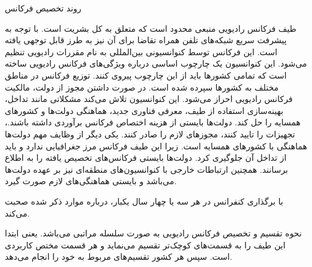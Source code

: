 \Problem
{روند تخصیص فرکانس}
{
طیف فرکانس رادیویی منبعی محدود است که متعلق به کل بشریت است. با توجه به پیشرفت سریع شبکه‌های تلفن همراه تقاضا برای آن نیز به طرز قابل توجهی یافته است.
این فرکانس توسط کنوانسیونی بین‌المللی به نام مقررات رادیویی تنظیم می‌شود. این کنوانسیون یک چارچوب اساسی درباره ویژگی‌های فرکانس رادیویی ساخته است که تمامی کشورها باید از این چارچوب پیروی کنند. توزیع فرکانس در مناطق مختلف به کشورها سپرده شده است. در صورت داشتن مجوز از دولت، مالکیت فرکانس رادیویی احراز می‌شود.
این کنوانسیون تلاش می‌کند مشکلاتی مانند تداخل، بهینه‌سازی استفاده از طیف، معرفی فناوری جدید، هماهنگی دولت‌ها و کشورهای همسایه را حل کند.
دولت‌ها بایستی از هزینه اختصاص فرکانس برآوردی داشته باشند.، تجهیزات را تایید کنند، مجوزهای لازم را صادر کنند.
یکی دیگر از وظایف مهم دولت‌ها هماهنگی با کشورهای همسایه است. زیرا این طیف فرکانس مرز جغرافیایی ندارد و باید از تداخل آن جلوگیری کرد.
دولت‌ها بایستی فرکانس‌های تخصیص یافته را به اطلاع
برسانند.
همچنین ارتباطات خارجی با کنوانسیون‌های منطقه‌ای نیز بر عهده دولت‌ها می‌باشد و بایستی هماهنگی‌های لازم صورت گیرد.

با برگذاری کنفرانس
در هر سه یا چهار سال یکبار، درباره موارد ذکر شده صحبت می‌کند.

نحوه تقسیم و تخصیص فرکانس رادیویی به صورت سلسله مراتبی می‌باشد.
یعنی ابتدا
این طیف را به قسمت‌های کوچک‌تر تقسیم می‌نماید و هر قسمت مختص کاربردی است.
سپس هر کشور تقسیم‌های مربوط به خود را انجام می‌دهد.
}
